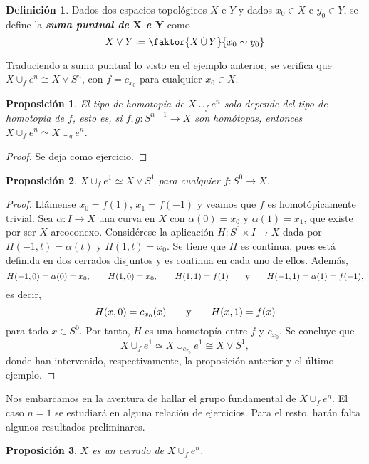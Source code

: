 \documentclass[11pt]{report}
\newenvironment{cdefinition} %
  {\begin{mdframed}[innertopmargin = 0pt,
                    innerbottommargin = 7.5pt,
                    backgroundcolor = lightgray!10,
                    linewidth = 1pt,
                    shadow = true,
                    shadowsize = 5pt,
                    roundcorner = 0pt,
                    skipabove = 0pt]
    \begin{definition}}
  {\end{definition}\end{mdframed}}
\newtheorem{proposition}{Proposición}[chapter]
\theoremstyle{definition}
\newtheorem{definition}{Definición}[chapter]
\theoremstyle{definition}
\theoremstyle{remark}
\begin{document}
\begin{cdefinition}
Dados dos espacios topológicos $X$ e $Y$ y dados $x_0 \in X$ e $y_0 \in Y$, se define la \textbf{\textit{suma puntual de $\bm{X}$ e $\bm{Y}$}} como
\[X \vee Y \coloneqq \faktor{X \, \dot\cup \, Y}{x_0 \sim y_0}\]
\end{cdefinition}

Traduciendo a suma puntual lo visto en el ejemplo anterior, se verifica que $X \cup_f e^n \cong X \vee S^n$, con $f = c_{x_0}$ para cualquier $x_0 \in X$.

\begin{proposition}
El tipo de homotopía de $X \cup_f e^n$ solo depende del tipo de homotopía de $f$, esto es, si $f,g \colon S^{n-1} \to X$ son homótopas, entonces $X \cup_f e^n \simeq X \cup_g e^n$.
\end{proposition}

\begin{proof}
Se deja como ejercicio.
\end{proof}

\begin{proposition}
$X \cup_f e^1 \simeq X \vee S^1$ para cualquier $f \colon S^0 \to X$.
\end{proposition}

\begin{proof}
Llámense $x_0 = f(1)$, $x_1 = f(-1)$ y veamos que $f$ es homotópicamente trivial. Sea $\alpha \colon I \to X$ una curva en $X$ con $\alpha (0)= x_0$ y $\alpha(1) = x_1$, que existe por ser $X$ arcoconexo. Considérese la aplicación $H \colon S^0 \times I \to X$ dada por $H(-1,t) = \alpha(t)$ y $H(1,t) = x_0$. Se tiene que $H$ es continua, pues está definida en dos cerrados disjuntos y es continua en cada uno de ellos. Además,
\[H(-1,0) = \alpha(0) = x_0, \qquad H(1,0) = x_0, \qquad H(1,1) = f(1) \qquad \textup{y} \qquad H(-1,1) = \alpha(1) = f(-1),\]
es decir,
\[H(x,0) = c_{x_0}(x) \qquad \textup{y} \qquad H(x,1)=f(x)\]
para todo $x \in S^0$. Por tanto, $H$ es una homotopía entre $f$ y $c_{x_0}$. Se concluye que 
\[X \cup_f e^1 \simeq X \cup_{c_{x_0}} e^1 \cong X \vee S^1,\] donde han intervenido, respectivamente, la proposición anterior y el último ejemplo.
\end{proof}

Nos embarcamos en la aventura de hallar el grupo fundamental de $X \cup_f e^n$. El caso $n = 1$ se estudiará en alguna relación de ejercicios. Para el resto, harán falta algunos resultados preliminares.

\begin{proposition}
$X$ es un cerrado de $X \cup_f e^n$.
\end{proposition}
\end{document}
